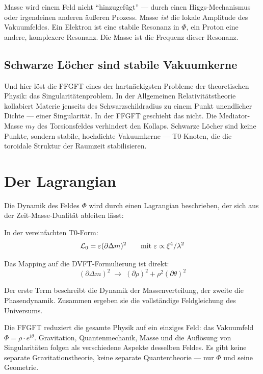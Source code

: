 Masse wird einem Feld nicht \enquote{hinzugefügt} --- durch einen Higgs-Mechanismus oder irgendeinen anderen äußeren Prozess. Masse \emph{ist} die lokale Amplitude des Vakuumfeldes. Ein Elektron ist eine stabile Resonanz in $\Phi$, ein Proton eine andere, komplexere Resonanz. Die Masse ist die Frequenz dieser Resonanz.

\subsection{Schwarze Löcher sind stabile Vakuumkerne}

Und hier löst die FFGFT eines der hartnäckigsten Probleme der theoretischen Physik: das Singularitätenproblem. In der Allgemeinen Relativitätstheorie kollabiert Materie jenseits des Schwarzschildradius zu einem Punkt unendlicher Dichte --- einer Singularität. In der FFGFT geschieht das nicht. Die Mediator-Masse $m_T$ des Torsionsfeldes verhindert den Kollaps. Schwarze Löcher sind keine Punkte, sondern stabile, hochdichte Vakuumkerne --- T0-Knoten, die die toroidale Struktur der Raumzeit stabilisieren.

\section{Der Lagrangian}

Die Dynamik des Feldes $\Phi$ wird durch einen Lagrangian beschrieben, der sich aus der Zeit-Masse-Dualität ableiten lässt:

In der vereinfachten T0-Form:
\begin{equation}
\mathcal{L}_0 = \varepsilon (\partial \Delta m)^2 \qquad \text{mit } \varepsilon \propto \xi^4/\lambda^2
\end{equation}

Das Mapping auf die DVFT-Formulierung ist direkt:
\begin{equation}
(\partial \Delta m)^2 \;\longrightarrow\; (\partial \rho)^2 + \rho^2 (\partial \theta)^2
\end{equation}

Der erste Term beschreibt die Dynamik der Massenverteilung, der zweite die Phasendynamik. Zusammen ergeben sie die vollständige Feldgleichung des Universums.

\begin{zusammenfassung}
Die FFGFT reduziert die gesamte Physik auf ein einziges Feld: das Vakuumfeld~$\Phi = \rho \cdot e^{i\theta}$. Gravitation, Quantenmechanik, Masse und die Auflösung von Singularitäten folgen als verschiedene Aspekte desselben Feldes. Es gibt keine separate Gravitationstheorie, keine separate Quantentheorie --- nur $\Phi$ und seine Geometrie.
\end{zusammenfassung}
